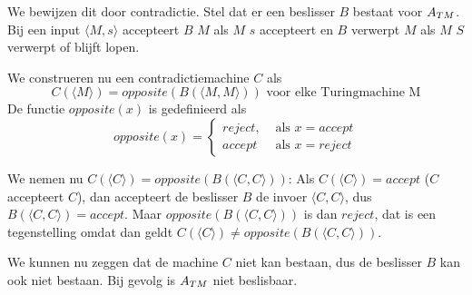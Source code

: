 We bewijzen dit door contradictie. Stel dat er een beslisser $B$ bestaat voor ${A_{TM}}$. Bij een input $\langle M,s \rangle$ accepteert $B$ $M$ als $M$ $s$ accepteert en $B$ verwerpt $M$ als $M$ $S$ verwerpt of blijft lopen.

We construeren nu een contradictiemachine $C$ als
\begin{equation*}
C(\langle M \rangle) = opposite(B(\langle M,M \rangle))\text{ voor elke Turingmachine M}
\end{equation*}
De functie $opposite(x)$ is gedefinieerd als
\begin{equation*}
opposite(x) = \begin{cases}
reject, & \text{ als } x = accept\\
accept & \text{ als } x = reject
\end{cases}
\end{equation*}

We nemen nu $C(\langle C \rangle) = opposite(B(\langle C,C \rangle))$:
Als $C(\langle C \rangle) = accept$ ($C$ accepteert $C$), dan accepteert de beslisser $B$ de invoer $\langle C,C \rangle$, dus $B(\langle C,C \rangle) = accept$. Maar $opposite(B(\langle C,C \rangle))$ is dan $reject$, dat is een tegenstelling omdat dan geldt $C(\langle C \rangle) \neq opposite(B(\langle C,C \rangle))$.

We kunnen nu zeggen dat de machine $C$ niet kan bestaan, dus de beslisser $B$ kan ook niet bestaan. Bij gevolg is ${A_{TM}}$ niet beslisbaar.